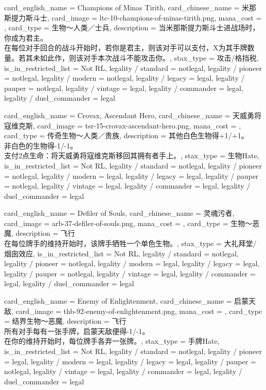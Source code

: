 \documentclass[lang = cn, color = black, 10pt]{AllThatStax}
\begin{document}
\card
{
	card_english_name = {Champions of Minas Tirith},
	card_chinese_name = {米那斯提力斯斗士},
	card_image = ltc-10-champions-of-minas-tirith.png,
	mana_cost = ,
	card_type = 生物～人类／士兵,
	description = {当米那斯提力斯斗士进战场时，你成为君主。\\
在每位对手回合的战斗开始时，若你是君主，则该对手可以支付，X为其手牌数量。若其未如此作，则该对手本次战斗不能攻击你。},
	stax_type = 攻击/格挡税,
	is_in_restricted_list = Not RL,
	legality / standard = notlegal,
	legality / pioneer = notlegal,
	legality / modern = notlegal,
	legality / legacy = legal,
	legality / pauper = notlegal,
	legality / vintage = legal,
	legality / commander = legal,
	legality / duel_commander = legal
}

\card
{
	card_english_name = {Crovax, Ascendant Hero},
	card_chinese_name = {天威勇将寇维克斯},
	card_image = tsr-15-crovax-ascendant-hero.png,
	mana_cost = ,
	card_type = 传奇生物～人类／贵族,
	description = {其他白色生物得+1/+1。\\
非白色的生物得-1/-1。\\
支付2点生命：将天威勇将寇维克斯移回其拥有者手上。},
	stax_type = 生物Hate,
	is_in_restricted_list = Not RL,
	legality / standard = notlegal,
	legality / pioneer = notlegal,
	legality / modern = legal,
	legality / legacy = legal,
	legality / pauper = notlegal,
	legality / vintage = legal,
	legality / commander = legal,
	legality / duel_commander = legal
}

\card
{
	card_english_name = {Defiler of Souls},
	card_chinese_name = {灵魂污者},
	card_image = arb-37-defiler-of-souls.png,
	mana_cost = ,
	card_type = 生物～恶魔,
	description = {飞行\\
在每位牌手的维持开始时，该牌手牺牲一个单色生物。},
	stax_type = 大礼拜堂/烟囱效应,
	is_in_restricted_list = Not RL,
	legality / standard = notlegal,
	legality / pioneer = notlegal,
	legality / modern = legal,
	legality / legacy = legal,
	legality / pauper = notlegal,
	legality / vintage = legal,
	legality / commander = legal,
	legality / duel_commander = legal
}

\card
{
	card_english_name = {Enemy of Enlightenment},
	card_chinese_name = {启蒙天敌},
	card_image = thb-92-enemy-of-enlightenment.png,
	mana_cost = ,
	card_type = 结界生物～恶魔,
	description = {飞行\\
所有对手每有一张手牌，启蒙天敌便得-1/-1。\\
在你的维持开始时，每位牌手各弃一张牌。},
	stax_type = 手牌Hate,
	is_in_restricted_list = Not RL,
	legality / standard = notlegal,
	legality / pioneer = legal,
	legality / modern = legal,
	legality / legacy = legal,
	legality / pauper = notlegal,
	legality / vintage = legal,
	legality / commander = legal,
	legality / duel_commander = legal
}
\end{document}
